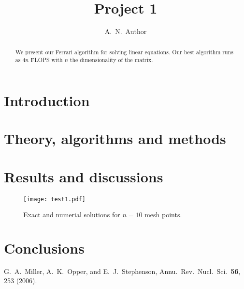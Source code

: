 \documentclass[10pt,showpacs,preprintnumbers,footinbib,amsmath,amssymb,aps,prl,twocolumn,groupedaddress,superscriptaddress,showkeys]{revtex4-1}
\begin{document}
\title{Project 1}
\author{A.~N.~Author}
\begin{abstract}
We present our Ferrari algorithm for solving linear equations. Our best algorithm runs as $4n$ FLOPS with $n$ the dimensionality of the matrix.
\end{abstract}
\maketitle

\section{Introduction}

\section{Theory, algorithms and methods}

\section{Results and discussions}

\begin{figure}[hbtp]
\texttt{[image: test1.pdf]}
\caption{Exact and numerial solutions for $n=10$ mesh points.} 
\label{fig:n10points}
\end{figure}

\section{Conclusions}

\begin{thebibliography}{99}
 G.~A.~Miller, A.~K.~Opper, and E.~J.~Stephenson, Annu.~Rev.~Nucl.~Sci.~{\bf 56}, 253 (2006).
\end{thebibliography}
\end{document}
